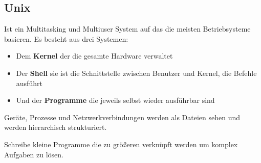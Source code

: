 \subsection{Unix}

Ist ein Multitasking und Multiuser System auf das die meisten Betriebsysteme basieren.
Es besteht aus drei Systemen:

\begin{itemize}
  \item Dem \textbf{Kernel} der die gesamte Hardware verwaltet
  \item Der \textbf{Shell} sie ist die Schnittstelle zwischen Benutzer und Kernel, die Befehle ausführt
  \item Und der \textbf{Programme} die jeweils selbst wieder ausführbar sind
\end{itemize}

Geräte, Prozesse und Netzwerkverbindungen werden als Dateien sehen und werden hierarchisch strukturiert.

Schreibe kleine Programme die zu größeren verknüpft werden um komplex Aufgaben zu lösen.
